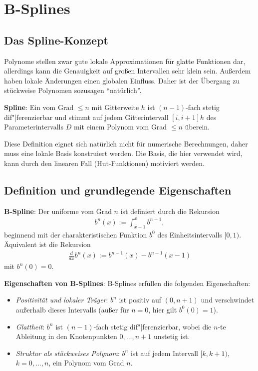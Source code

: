 \chapter{%
    B-Splines%
}

\section{%
    Das Spline-Konzept%
}

Polynome stellen zwar gute lokale Approximationen für glatte Funktionen dar,
allerdings kann die Genauigkeit auf großen Intervallen sehr klein sein.
Außerdem haben lokale Änderungen einen globalen Einfluss.
Daher ist der Übergang zu stückweise Polynomen sozusagen "`natürlich"'.

\textbf{Spline}:
Ein  vom Grad $\le n$ mit Gitterweite $h$ ist $(n - 1)$-fach stetig
dif"|ferenzierbar und stimmt auf jedem Gitterintervall $[i, i+1]h$ des Parameterintervalls $D$ mit
einem Polynom vom Grad $\le n$ überein.

Diese Definition eignet sich natürlich nicht für numerische Berechnungen,
daher muss eine lokale Basis konstruiert werden.
Die Basis, die hier verwendet wird, kann durch den linearen Fall (Hut-Funktionen) motiviert werden.

\section{%
    Definition und grundlegende Eigenschaften%
}

\textbf{B-Spline}:
Der uniforme  vom Grad $n$ ist definiert durch die Rekursion
\begin{align*}
    b^n(x) := \int_{x-1}^x b^{n-1},
\end{align*}
beginnend mit der charakteristischen Funktion $b^0$ des Einheitsintervalls $[0, 1)$.
Äquivalent ist die Rekursion
\begin{align*}
    \frac{d}{dx} b^n(x) := b^{n-1}(x) - b^{n-1}(x - 1)
\end{align*}
mit $b^n(0) = 0$.

\linie

\textbf{Eigenschaften von B-Splines}:
B-Splines erfüllen die folgenden Eigenschaften:
\begin{itemize}
    \item
    \emph{Positivität und lokaler Träger}:
    $b^n$ ist positiv auf $(0, n + 1)$ und verschwindet außerhalb dieses Intervalls
    (außer für $n = 0$, hier gilt $b^0(0) = 1$).

    \item
    \emph{Glattheit}:
    $b^n$ ist $(n - 1)$-fach stetig dif"|ferenzierbar, wobei die $n$-te Ableitung in den
    Knotenpunkten $0, \dotsc, n + 1$ unstetig ist.

    \item
    \emph{Struktur als stückweises Polynom}:
    $b^n$ ist auf jedem Intervall $[k, k + 1)$, $k = 0, \dotsc, n$, ein Polynom vom Grad $n$.
\end{itemize}

